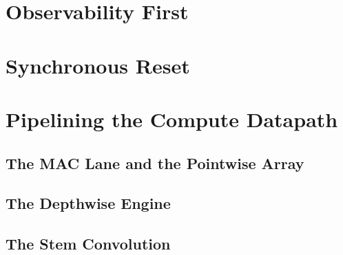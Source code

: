 \section{Observability First}
\label{sec:phase1}

\section{Synchronous Reset}
\label{sec:sync-reset}

\section{Pipelining the Compute Datapath}
\label{sec:pipelining}

\subsection{The MAC Lane and the Pointwise Array}
\label{sec:pipeline-mac}

\subsection{The Depthwise Engine}
\label{sec:pipeline-dw}

\subsection{The Stem Convolution}
\label{sec:pipeline-stem}

